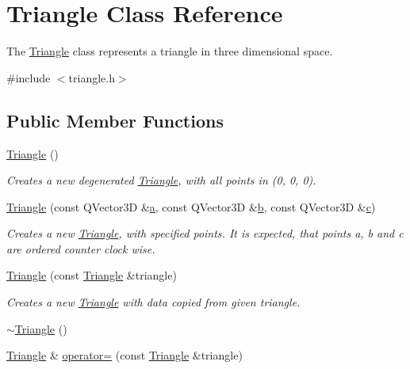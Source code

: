 \hypertarget{class_triangle}{\section{Triangle Class Reference}
\label{class_triangle}
}


The \hyperlink{class_triangle}{Triangle} class represents a triangle in three dimensional space.  




{\ttfamily \#include $<$triangle.\+h$>$}

\subsection*{Public Member Functions}
\begin{DoxyCompactItemize}
\item 
\hyperlink{class_triangle_aaefe4ed500c07918d30c6f0e286332c5}{Triangle} ()
\begin{DoxyCompactList}\small\item\em Creates a new degenerated \hyperlink{class_triangle}{Triangle}, with all points in (0, 0, 0). \end{DoxyCompactList}\item 
\hyperlink{class_triangle_a89052ece2572bfee5d6ade44b9f5094d}{Triangle} (const Q\+Vector3\+D \&\hyperlink{class_triangle_a430bf0a9d8eaf20ea7bdefcd8082588c}{a}, const Q\+Vector3\+D \&\hyperlink{class_triangle_a8327124c9b9b752be94187c9fbf3f460}{b}, const Q\+Vector3\+D \&\hyperlink{class_triangle_a61f6c0245df276555de6d1b1a98840b8}{c})
\begin{DoxyCompactList}\small\item\em Creates a new \hyperlink{class_triangle}{Triangle}, with specified points. It is expected, that points a, b and c are ordered counter clock wise. \end{DoxyCompactList}\item 
\hyperlink{class_triangle_a889893fe34e2eb7121082b86199d5628}{Triangle} (const \hyperlink{class_triangle}{Triangle} \&triangle)
\begin{DoxyCompactList}\small\item\em Creates a new \hyperlink{class_triangle}{Triangle} with data copied from given triangle. \end{DoxyCompactList}\item 
\hyperlink{class_triangle_a5199760a17454f4dc94c855a57e3a152}{$\sim$\+Triangle} ()
\item 
\hyperlink{class_triangle}{Triangle} \& \hyperlink{class_triangle_aae57b61e09898f54256a83e76acfe502}{operator=} (const \hyperlink{class_triangle}{Triangle} \&triangle)

\end{DoxyCompactItemize}
